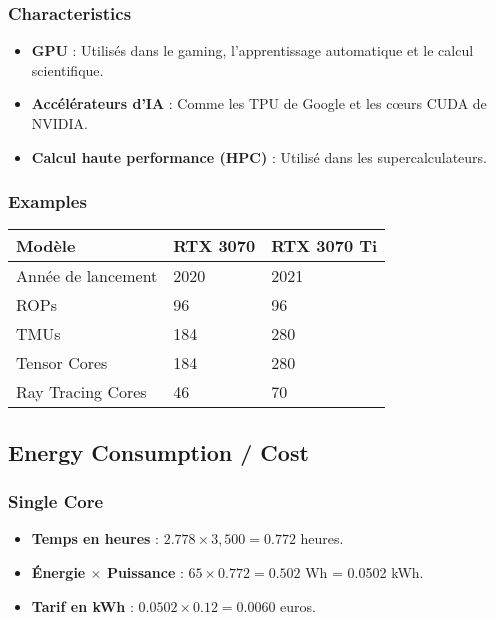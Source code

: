 \documentclass[10pt,a4paper]{article}
\begin{document}
\subsubsection*{Characteristics}
\begin{itemize}
    \item \textbf{GPU} : Utilisés dans le gaming, l'apprentissage automatique et le calcul scientifique.
    \item \textbf{Accélérateurs d'IA} : Comme les TPU de Google et les cœurs CUDA de NVIDIA.
    \item \textbf{Calcul haute performance (HPC)} : Utilisé dans les supercalculateurs.
\end{itemize}

\subsubsection*{Examples}
\begin{center}
\begin{tabular}{|l|l|l|}
\hline
\textbf{Modèle} & \textbf{RTX 3070} & \textbf{RTX 3070 Ti} \\
\hline
Année de lancement & 2020 & 2021 \\
\hline
ROPs & 96 & 96 \\
\hline
TMUs & 184 & 280 \\
\hline
Tensor Cores & 184 & 280 \\
\hline
Ray Tracing Cores & 46 & 70 \\
\hline
\end{tabular}
\end{center}

\subsection*{Energy Consumption / Cost}

\subsubsection*{Single Core}
\begin{itemize}
    \item \textbf{Temps en heures} : \(2.778 \times 3,500 = 0.772\) heures.
    \item \textbf{Énergie \(\times\) Puissance} : \(65 \times 0.772 = 0.502\) Wh = 0.0502 kWh.
    \item \textbf{Tarif en kWh} : \(0.0502 \times 0.12 = 0.0060\) euros.
\end{itemize}
\end{document}
